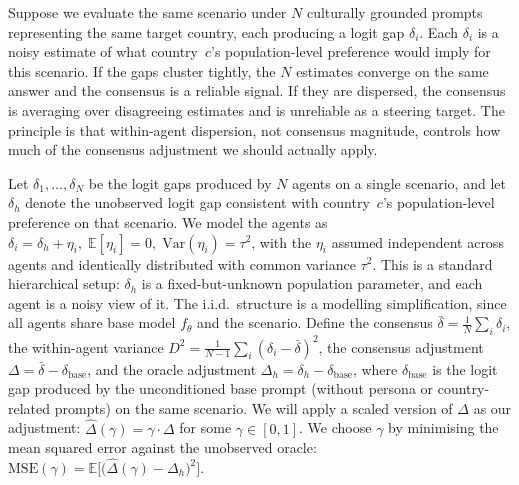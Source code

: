\documentclass{article}
\begin{document}
Suppose we evaluate the same scenario under $N$ culturally grounded 
prompts representing the same target country, each producing a logit 
gap $\delta_i$. Each $\delta_i$ is a noisy estimate of what 
country~$c$'s population-level preference would imply for this 
scenario. If the gaps cluster tightly, the $N$ estimates 
converge on the same answer and the consensus is a reliable signal. 
If they are dispersed, the consensus is averaging over disagreeing 
estimates and is unreliable as a steering target. The principle is 
that within-agent dispersion, not consensus magnitude, controls how 
much of the consensus adjustment we should actually apply.

Let $\delta_1, \ldots, \delta_N$ be the logit gaps produced by $N$ agents on a single scenario, and let $\delta_h$ denote the unobserved logit gap 
consistent with country~$c$'s population-level preference on that 
scenario. We model the agents as
$\delta_i = \delta_h + \eta_i, \;\mathbb{E}[\eta_i] = 0, \;
\mathrm{Var}(\eta_i) = \tau^2$,
with the $\eta_i$ assumed independent across agents and identically 
distributed with common variance $\tau^2$. This is a standard 
hierarchical setup: $\delta_h$ is a fixed-but-unknown population 
parameter, and each agent is a noisy view of it. The i.i.d.\ 
structure is a modelling simplification, since all agents share base model $f_\theta$ and the scenario.
%
Define the consensus $\bar{\delta} = \frac{1}{N}\sum_i \delta_i$, 
the within-agent variance 
$D^2 = \frac{1}{N-1}\sum_i (\delta_i - \bar{\delta})^2$, the 
consensus adjustment $\Delta = \bar{\delta} - \delta_{\text{base}}$, 
and the oracle adjustment $\Delta_h = \delta_h - \delta_{\text{base}}$, where $\delta_{\text{base}}$ is the logit gap produced by the
unconditioned base prompt (without persona or country-related prompts) on the same scenario.
%
We will apply a scaled version of $\Delta$ as our adjustment: 
$\hat\Delta(\gamma) = \gamma \cdot \Delta$ for some 
$\gamma \in [0,1]$. We choose $\gamma$ by minimising the mean 
squared error against the unobserved oracle:
$\mathrm{MSE}(\gamma) = \mathbb{E}\big[\big(\hat\Delta(\gamma) - 
\Delta_h\big)^2\big]$.
\end{document}
